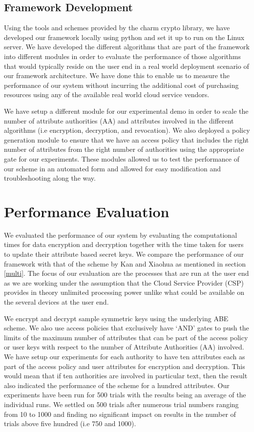 \subsection{Framework Development}

Using the tools and schemes provided by the charm crypto library, we have developed our framework locally using python and set it up to run on the Linux server. We have developed the different algorithms that are part of the framework into different modules in order to evaluate the performance of those algorithms that would typically reside on the user end in a real world deployment scenario of our framework architecture. We have done this to enable us to measure the performance of our system without incurring the additional cost of purchasing resources using any of the available real world cloud service vendors.

We have setup a different module for our experimental demo in order to scale the number of attribute authorities (AA) and attributes involved in the different algorithms (i.e encryption, decryption, and revocation). We also deployed a policy generation module to ensure that we have an access policy that includes the right number of attributes from the right number of authorities using the appropriate gate for our experiments. These modules allowed us to test the performance of our scheme in an automated form and allowed for easy modification and troubleshooting along the way.

\section{Performance Evaluation}

We evaluated the performance of our system by evaluating the computational times for data encryption and decryption together with the time taken for users to update their attribute based secret keys. We compare the performance of our framework with that of the scheme by Kan and Xiaohua \cite{Yang2014} as mentioned in section \ref{multi}. The focus of our evaluation are the processes that are run at the user end as we are working under the assumption that the Cloud Service Provider (CSP) provides in theory unlimited processing power unlike what could be available on the several devices at the user end.

We encrypt and decrypt sample symmetric keys using the underlying ABE scheme. We also use access policies that exclusively have `AND' gates to push the limits of the maximum number of attributes that can be part of the access policy or user keys with respect to the number of Attribute Authorities (AA) involved. We have setup our experiments for each authority to have ten attributes each as part of the access policy and user attributes for encryption and decryption. This would mean that if ten authorities are involved in particular text, then the result also indicated the performance of the scheme for a hundred attributes. Our experiments have been run for 500 trials with the results being an average of the individual runs. We settled on 500 trials after numerous trial numbers ranging from 10 to 1000 and finding no significant impact on results in the number of trials above five hundred (i.e 750 and 1000).

